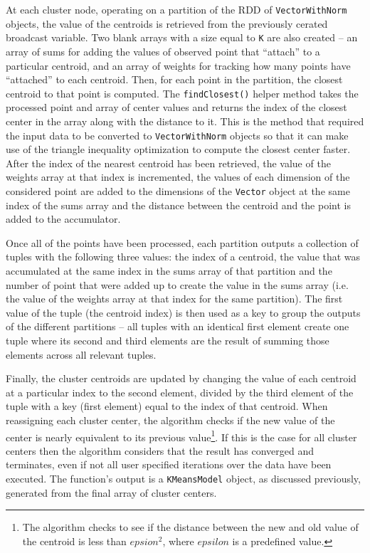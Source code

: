 \documentclass{l4proj}
\begin{document}
At each cluster node, operating on a partition of the RDD of \texttt{VectorWithNorm} objects, the value of the centroids is retrieved from the previously cerated broadcast variable. Two blank arrays with a size equal to \texttt{K} are also created -- an array of sums for adding the values of observed point that ``attach'' to a particular centroid, and an array of weights for tracking how many points have ``attached'' to each centroid. Then, for each point in the partition, the closest centroid to that point is computed. The \texttt{findClosest()} helper method takes the processed point and array of center values and returns the index of the closest center in the array along with the distance to it. This is the method that required the input data to be converted to \texttt{VectorWithNorm} objects so that it can  make use of the triangle inequality optimization to compute the closest center faster\cite{Triangle}. After the index of the nearest centroid has been retrieved, the value of the weights array at that index is incremented, the values of each dimension of the considered point are added to the dimensions of the \texttt{Vector} object at the same index of the sums array and the distance between the centroid and the point is added to the accumulator.

Once all of the points have been processed, each partition outputs a collection of tuples with the following three values: the index of a centroid, the value that was accumulated at the same index in the sums array of that partition and the number of point that were added up to create the value in the sums array (i.e. the value of the weights array at that index for the same partition). The first value of the tuple (the centroid index) is then used as a key to group the outputs of the different partitions -- all tuples with an identical first element create one tuple where its second and third elements are the result of summing those elements across all relevant tuples.

Finally, the cluster centroids are updated by changing the value of each centroid at a particular index to the second element, divided by the third element of the tuple with a key (first element) equal to the index of that centroid. When reassigning each cluster center, the algorithm checks if the new value of the center is nearly equivalent to its previous value\footnote{The algorithm checks to see if the distance between the new and old value of the centroid is less than $epsion^2$, where $epsilon$ is a predefined value.}.  If this is the case for all cluster centers then the algorithm considers that the result has converged and terminates, even if not all user specified iterations over the data have been executed. The function's output is a \texttt{KMeansModel} object, as discussed previously, generated from the final array of cluster centers.
\end{document}
